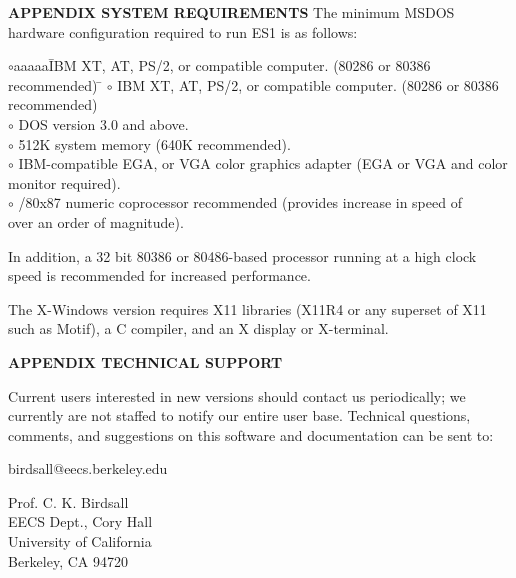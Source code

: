 \newpage
\noindent
\begin{appendix}
\begin{section}
{\bf APPENDIX SYSTEM REQUIREMENTS}
The minimum MSDOS hardware configuration required to run ES1 is as follows:

\begin{tabbing}
     $\circ$aaaaa\=   IBM XT, AT, PS/2, or compatible computer.  (80286 or 80386
          recommended) \= \kill
     $\circ$ \>   IBM XT, AT, PS/2, or compatible computer.  (80286 or 80386
          recommended) \> \\

     $\circ$ \>   DOS version 3.0 and above. \> \\

     $\circ$ \>   512K system memory (640K recommended). \> \\

     $\circ$ \>  IBM-compatible EGA, or VGA color graphics adapter (EGA or VGA
          and color \> \\
	     \>
		monitor required). \> \\

     $\circ$ /80x87 numeric coprocessor recommended (provides increase in
          speed of \> \\
	     \> over an order of magnitude). \> 
\end{tabbing}

\noindent
In addition, a 32 bit 80386 or 80486-based processor running at a high clock
speed is recommended for increased performance.
\vspace{.2in}

\noindent
The X-Windows version requires X11 libraries (X11R4 or any superset of X11 such
as Motif), a C compiler, and an X display or X-terminal.
\end{section}

\newpage
\noindent
\begin{section}
{\bf APPENDIX TECHNICAL SUPPORT}

Current users interested in new versions should contact us periodically; we
currently are not staffed to notify our entire user base.  Technical questions,
comments, and suggestions on this software and documentation can be sent to:

\noindent
     birdsall@eecs.berkeley.edu
\vspace{0.2in}

\noindent
        Prof. C. K. Birdsall                    			\\
        EECS Dept., Cory Hall                   			\\
        University of California	       				\\
        Berkeley, CA  94720                     			\\
\end{section}
\end{appendix}

